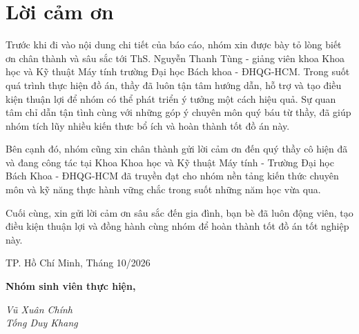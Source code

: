 \newpage

\section*{\Huge Lời cảm ơn}

Trước khi đi vào nội dung chi tiết của báo cáo, nhóm xin được bày tỏ lòng biết ơn chân thành và sâu sắc tới ThS. Nguyễn Thanh Tùng - giảng viên khoa Khoa học và Kỹ thuật Máy tính trường Đại học Bách khoa - ĐHQG-HCM. Trong suốt quá trình thực hiện đồ án, thầy đã luôn tận tâm hướng dẫn, hỗ trợ và tạo điều kiện thuận lợi để nhóm có thể phát triển ý tưởng một cách hiệu quả. Sự quan tâm chỉ dẫn tận tình cùng với những góp ý chuyên môn quý báu từ thầy, đã giúp nhóm tích lũy nhiều kiến thưc bổ  ích và hoàn thành tốt đồ án này.

Bên cạnh đó, nhóm cũng xin chân thành gửi lời cảm ơn đến quý thầy cô hiện đã và đang công tác tại Khoa Khoa học và Kỹ thuật Máy tính - Trường Đại học Bách Khoa - ĐHQG-HCM đã truyền đạt cho nhóm nền tảng kiến thức chuyên môn và kỹ năng thực hành vững chắc trong suốt những năm học vừa qua.

Cuối cùng, xin gửi lời cảm ơn sâu sắc đến gia đình, bạn bè đã luôn động viên, tạo điều kiện thuận lợi và đồng hành cùng nhóm để hoàn thành tốt đồ án tốt nghiệp này.
\newline

\begin{flushright}
\begin{minipage}[t]{0.48\textwidth}
\begin{center}
    TP. Hồ Chí Minh, Tháng 10/2026
    
    \textbf{Nhóm sinh viên thực hiện,}

    \textit{Vũ Xuân Chính} \\
    \textit{Tống Duy Khang}
\end{center}
\end{minipage}
\end{flushright}
